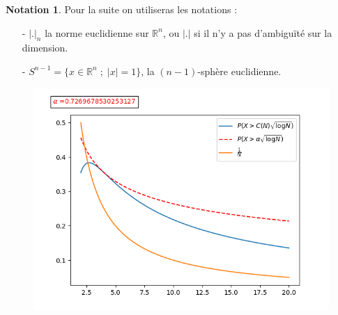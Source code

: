 \documentclass[12pt]{article}
\theoremstyle{definition}
\newtheorem*{notation}{Notation}
\begin{document}
\begin{notation}
	Pour la suite on utiliseras les notations : 
	\begin{enumerate}
		\item[-] $|.|_n$ la norme euclidienne sur $\mathbb{R}^n$, ou $|.|$ si il n'y a pas d'ambiguïté sur la dimension.
		\item[-] $S^{n-1} = \big\{x\in \mathbb{R}^n\; ;\; |x|=1\big\}$, la $(n-1)$-sphère euclidienne. 
	\end{enumerate}
\end{notation}
\begin{figure}
	\centering
	\includegraphics[scale=0.4]{figure_1.png}
\end{figure}
\end{document}
